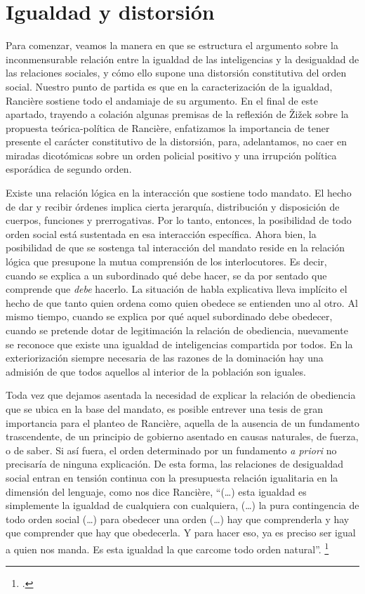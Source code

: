 \section{Igualdad y distorsión}


Para comenzar, veamos la manera en que se estructura el argumento sobre la inconmensurable relación entre la igualdad de las inteligencias y la desigualdad de las relaciones sociales, y cómo ello supone una distorsión constitutiva del orden social. Nuestro punto de partida es que en la caracterización de la igualdad, Rancière sostiene todo el andamiaje de su argumento. En el final de este apartado, trayendo a colación algunas premisas de la reflexión de Žižek sobre la propuesta teórica-política de Rancière, enfatizamos la importancia de tener presente el carácter constitutivo de la distorsión, para, adelantamos, no caer en miradas dicotómicas sobre un orden policial positivo y una irrupción política esporádica de segundo orden.

Existe una relación lógica en la interacción que sostiene todo mandato. El hecho de dar y recibir órdenes implica cierta jerarquía, distribución y disposición de cuerpos, funciones y prerrogativas. Por lo tanto, entonces, la posibilidad de todo orden social está sustentada en esa interacción específica. Ahora bien, la posibilidad de que se sostenga tal interacción del mandato reside en la relación lógica que presupone la mutua comprensión de los interlocutores. Es decir, cuando se explica a un subordinado qué debe hacer, se da por sentado que comprende que \emph{debe} hacerlo. La situación de habla explicativa lleva implícito el hecho de que tanto quien ordena como quien obedece se entienden uno al otro. Al mismo tiempo, cuando se explica por qué aquel subordinado debe obedecer, cuando se pretende dotar de legitimación la relación de obediencia, nuevamente se reconoce que existe una igualdad de inteligencias compartida por todos. En la exteriorización siempre necesaria de las razones de la dominación hay una admisión de que todos aquellos al interior de la población son iguales.

Toda vez que dejamos asentada la necesidad de explicar la relación de obediencia que se ubica en la base del mandato, es posible entrever una tesis de gran importancia para el planteo de Rancière, aquella de la ausencia de un fundamento trascendente, de un principio de gobierno asentado en causas naturales, de fuerza, o de saber. Si así fuera, el orden determinado por un fundamento \emph{a priori} no precisaría de ninguna explicación. De esta forma, las relaciones de desigualdad social entran en tensión continua con la presupuesta relación igualitaria en la dimensión del lenguaje, como nos dice Rancière, \enquote{(\ldots) esta igualdad es simplemente la igualdad de cualquiera con cualquiera, (\ldots) la pura contingencia de todo orden social (\ldots) para obedecer una orden (\ldots) hay que comprenderla y hay que comprender que hay que obedecerla. Y para hacer eso, ya es preciso ser igual a quien nos manda. Es esta igualdad la que carcome todo orden natural}. \footcite[][30-31]{@7064-RANCIERE2010}

